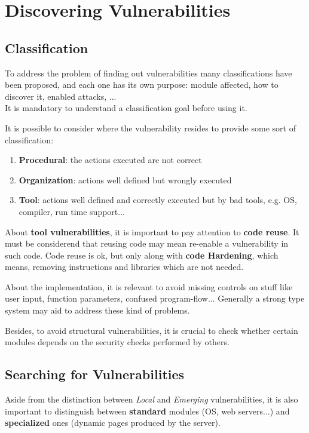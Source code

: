 \chapter{Discovering Vulnerabilities}
\section{Classification}
To address the problem of finding out vulnerabilities many classifications have been proposed,
and each one has its own purpose: module affected, how to discover it, enabled attacks, ...\\
It is mandatory to understand a classification goal before using it.

It is possible to consider where the vulnerability resides to provide some sort of classification:
\begin{enumerate}
    \item \textbf{Procedural}: the actions executed are not correct
    \item \textbf{Organization}: actions well defined but wrongly executed
    \item \textbf{Tool}: actions well defined and correctly executed but by bad tools, e.g. OS, compiler, run time support...
\end{enumerate}

About \textbf{tool vulnerabilities}, it is important to pay attention to \textbf{code reuse}.
It must be considerend that reusing code may mean re-enable a vulnerability in such code.
Code reuse is ok, but only along with \textbf{code Hardening}, which means, removing instructions and libraries which are not needed.

About the implementation, it is relevant to avoid missing controls on stuff like user input, function parameters, confused program-flow...
Generally a strong type system may aid to address these kind of problems.

Besides, to avoid structural vulnerabilities, it is crucial to check whether certain modules depends on the security checks performed by others.

\section*{Searching for Vulnerabilities}
Aside from the distinction between \textit{Local} and \textit{Emerging} vulnerabilities, it is also important to distinguish between \textbf{standard} modules (OS, web servers...) and \textbf{specialized} ones (dynamic pages produced by the server).

